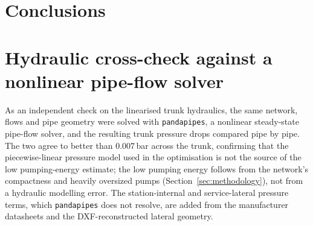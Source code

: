 \documentclass[a4paper,fleqn]{cas-sc}
\newcommand{\new}[1]{\textcolor[HTML]{1A5FB4}{#1}}   %
\newcommand{\new}[1]{#1}
\begin{document}
\section{Conclusions}\label{sec:conclusion}
\new{}



\appendix

\section{Hydraulic cross-check against a nonlinear pipe-flow solver}\label{app:pandapipes}
As an independent check on the linearised trunk hydraulics, the same network, flows and pipe
geometry were solved with \texttt{pandapipes}, a nonlinear steady-state pipe-flow solver, and
the resulting trunk pressure drops compared pipe by pipe. The two agree to better than
$0.007$\,bar across the trunk, confirming that the piecewise-linear pressure model used in the
optimisation is not the source of the low pumping-energy estimate; the low pumping energy
follows from the network's compactness and heavily oversized pumps (Section~\ref{sec:methodology}),
not from a hydraulic modelling error. The station-internal and service-lateral pressure terms,
which \texttt{pandapipes} does not resolve, are added from the manufacturer datasheets and the
DXF-reconstructed lateral geometry.

\new{}
\new{}

\printcredits


\end{document}
